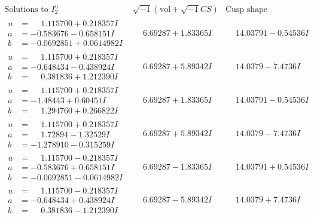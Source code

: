 \documentclass[1p]{elsarticle_modified}
\theoremstyle{definition}
\newcommand{\I}{\sqrt{-1}}
\begin{document}
$$\begin{array}{c|c|c}  
\text{Solutions to }I^u_{2}& \I (\text{vol} + \sqrt{-1}CS) & \text{Cusp shape}\\
 \hline 
\begin{aligned}
u &= \phantom{-}1.115700 + 0.218357 I \\
a &= -0.583676 - 0.658151 I \\
b &= -0.0692851 + 0.0614982 I\end{aligned}
 & \phantom{-}6.69287 + 1.83365 I & \phantom{-}14.03791 - 0.54536 I \\ \hline\begin{aligned}
u &= \phantom{-}1.115700 + 0.218357 I \\
a &= -0.648434 - 0.438924 I \\
b &= \phantom{-}0.381836 + 1.212390 I\end{aligned}
 & \phantom{-}6.69287 + 5.89342 I & \phantom{-}14.0379 - 7.4736 I \\ \hline\begin{aligned}
u &= \phantom{-}1.115700 + 0.218357 I \\
a &= -1.48443 + 0.60451 I \\
b &= \phantom{-}1.294760 + 0.266822 I\end{aligned}
 & \phantom{-}6.69287 + 1.83365 I & \phantom{-}14.03791 - 0.54536 I \\ \hline\begin{aligned}
u &= \phantom{-}1.115700 + 0.218357 I \\
a &= \phantom{-}1.72894 - 1.32529 I \\
b &= -1.278910 - 0.315259 I\end{aligned}
 & \phantom{-}6.69287 + 5.89342 I & \phantom{-}14.0379 - 7.4736 I \\ \hline\begin{aligned}
u &= \phantom{-}1.115700 - 0.218357 I \\
a &= -0.583676 + 0.658151 I \\
b &= -0.0692851 - 0.0614982 I\end{aligned}
 & \phantom{-}6.69287 - 1.83365 I & \phantom{-}14.03791 + 0.54536 I \\ \hline\begin{aligned}
u &= \phantom{-}1.115700 - 0.218357 I \\
a &= -0.648434 + 0.438924 I \\
b &= \phantom{-}0.381836 - 1.212390 I\end{aligned}
 & \phantom{-}6.69287 - 5.89342 I & \phantom{-}14.0379 + 7.4736 I \\ \hline\begin{aligned}

\end{aligned}
\end{array}$$
\end{document}
